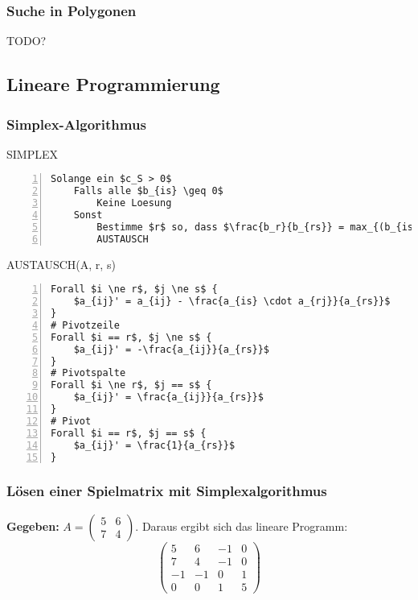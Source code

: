\subsubsection{Suche in Polygonen}
TODO?


\subsection{Lineare Programmierung}

\subsubsection{Simplex-Algorithmus}

\begin{minipage}{\textwidth}
SIMPLEX
\begin{lstlisting}[frame=single,numbers=left,mathescape]
Solange ein $c_S > 0$
	Falls alle $b_{is} \geq 0$
		Keine Loesung
	Sonst
		Bestimme $r$ so, dass $\frac{b_r}{b_{rs}} = max_{(b_{is} < 0)}~\frac{b_i}{b_{is}}$
		AUSTAUSCH
\end{lstlisting}
\end{minipage}

\begin{minipage}{\textwidth}
AUSTAUSCH(A, r, s)
\begin{lstlisting}[frame=single,numbers=left,mathescape]
Forall $i \ne r$, $j \ne s$ {
	$a_{ij}' = a_{ij} - \frac{a_{is} \cdot a_{rj}}{a_{rs}}$
}
# Pivotzeile
Forall $i == r$, $j \ne s$ {
	$a_{ij}' = -\frac{a_{ij}}{a_{rs}}$
}
# Pivotspalte
Forall $i \ne r$, $j == s$ {
	$a_{ij}' = \frac{a_{ij}}{a_{rs}}$
}
# Pivot
Forall $i == r$, $j == s$ {
	$a_{ij}' = \frac{1}{a_{rs}}$
}
\end{lstlisting}
\end{minipage}

\subsubsection{Lösen einer Spielmatrix mit Simplexalgorithmus}
\textbf{Gegeben:} \(A = \begin{pmatrix} 5 & 6 \\ 7 & 4 \end{pmatrix}\). Daraus ergibt sich das lineare Programm:
\[\begin{pmatrix} 5 & 6 & -1 & 0 \\ 7 & 4 & -1 & 0 \\ -1 & -1 & 0 & 1 \\ 0 & 0 & 1 & 5 \end{pmatrix}\]

